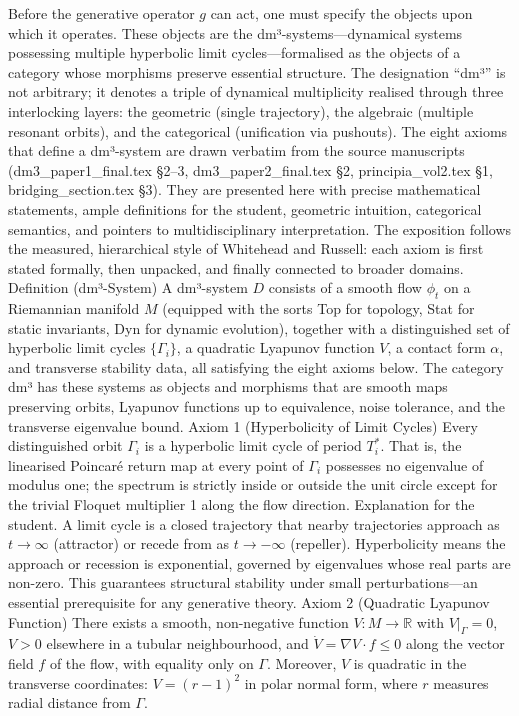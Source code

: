 Before the generative operator $  g  $ can act, one must specify the objects upon which it operates. These objects are the dm³-systems—dynamical systems possessing multiple hyperbolic limit cycles—formalised as the objects of a category whose morphisms preserve essential structure. The designation “dm³” is not arbitrary; it denotes a triple of dynamical multiplicity realised through three interlocking layers: the geometric (single trajectory), the algebraic (multiple resonant orbits), and the categorical (unification via pushouts). The eight axioms that define a dm³-system are drawn verbatim from the source manuscripts (dm3_paper1_final.tex §2–3, dm3_paper2_final.tex §2, principia_vol2.tex §1, bridging_section.tex §3). They are presented here with precise mathematical statements, ample definitions for the student, geometric intuition, categorical semantics, and pointers to multidisciplinary interpretation. The exposition follows the measured, hierarchical style of Whitehead and Russell: each axiom is first stated formally, then unpacked, and finally connected to broader domains.
Definition (dm³-System)
A dm³-system $  D  $ consists of a smooth flow $  \phi_t  $ on a Riemannian manifold $  M  $ (equipped with the sorts Top for topology, Stat for static invariants, Dyn for dynamic evolution), together with a distinguished set of hyperbolic limit cycles $  \{\Gamma_i\}  $, a quadratic Lyapunov function $  V  $, a contact form $  \alpha  $, and transverse stability data, all satisfying the eight axioms below. The category dm³ has these systems as objects and morphisms that are smooth maps preserving orbits, Lyapunov functions up to equivalence, noise tolerance, and the transverse eigenvalue bound.
Axiom 1 (Hyperbolicity of Limit Cycles)
Every distinguished orbit $  \Gamma_i  $ is a hyperbolic limit cycle of period $  T_i^*  $. That is, the linearised Poincaré return map at every point of $  \Gamma_i  $ possesses no eigenvalue of modulus one; the spectrum is strictly inside or outside the unit circle except for the trivial Floquet multiplier 1 along the flow direction.
Explanation for the student. A limit cycle is a closed trajectory that nearby trajectories approach as $  t \to \infty  $ (attractor) or recede from as $  t \to -\infty  $ (repeller). Hyperbolicity means the approach or recession is exponential, governed by eigenvalues whose real parts are non-zero. This guarantees structural stability under small perturbations—an essential prerequisite for any generative theory.
Axiom 2 (Quadratic Lyapunov Function)
There exists a smooth, non-negative function $  V: M \to \mathbb{R}  $ with $  V|_{\Gamma} = 0  $, $  V > 0  $ elsewhere in a tubular neighbourhood, and $  \dot{V} = \nabla V \cdot f \le 0  $ along the vector field $  f  $ of the flow, with equality only on $  \Gamma  $. Moreover, $  V  $ is quadratic in the transverse coordinates: $  V = (r-1)^2  $ in polar normal form, where $  r  $ measures radial distance from $  \Gamma  $.
